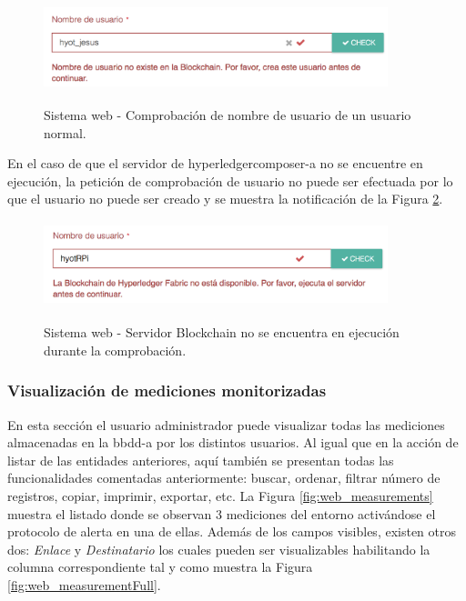 \documentclass[12pt,a4paper, twoside]{report}
\begin{document}
		\begin{figure}[!ht]   
			\caption{Sistema web - Comprobación de nombre de usuario de un usuario normal.} 
			\begin{center}
	 			\includegraphics[width=10cm, height=2.5cm]{Images/userGuide/web/userBC} \\
	 			\label{fig:web_userBC} 
			\end{center}  	
		\end{figure}
		
	En el caso de que el servidor de \gls{hyperledgercomposer-a} no se encuentre en ejecución, la petición de comprobación de usuario no puede ser efectuada por lo que el usuario no puede ser creado y se muestra la notificación de la Figura \ref{fig:web_userBCError}. 	
	
		\begin{figure}[!ht]   
			\caption{Sistema web - Servidor Blockchain no se encuentra en ejecución durante la comprobación.} 
			\begin{center}
	 			\includegraphics[width=10cm, height=2.5cm]{Images/userGuide/web/userBCError} \\
	 			\label{fig:web_userBCError} 
			\end{center}  	
		\end{figure}
	
	\subsubsection{Visualización de mediciones monitorizadas}
	
	En esta sección el usuario administrador puede visualizar todas las mediciones almacenadas en la \gls{bbdd-a} por los distintos usuarios. Al igual que en la acción de listar de las entidades anteriores, aquí también se presentan todas las funcionalidades comentadas anteriormente: buscar, ordenar, filtrar número de registros, copiar, imprimir, exportar, etc. La Figura \ref{fig:web_measurements} muestra el listado donde se observan 3 mediciones del entorno activándose el protocolo de alerta en una de ellas. Además de los campos visibles, existen otros dos: \textit{Enlace} y \textit{Destinatario} los cuales pueden ser visualizables habilitando la columna correspondiente tal y como muestra la Figura \ref{fig:web_measurementFull}. \\
	
\end{document}
